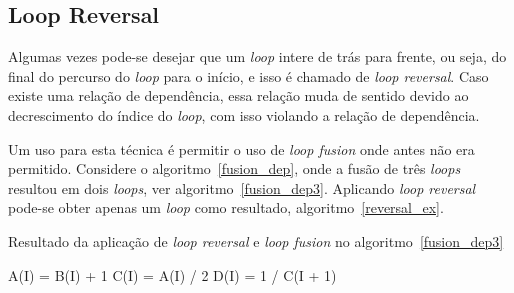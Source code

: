 \subsection{Loop Reversal}

Algumas vezes pode-se desejar que um \textit{loop} intere de trás para frente,
ou seja, do final do percurso do \textit{loop} para o início, e isso é chamado
de \textit{loop reversal}.
Caso existe uma relação de dependência, essa relação muda de sentido devido ao
decrescimento do índice do \textit{loop}, com isso violando a relação de 
dependência.

Um uso para esta técnica é permitir o uso de \textit{loop fusion} onde antes não
era permitido. 
Considere o algoritmo~\ref{fusion_dep}, onde a fusão de três \textit{loops}
resultou em dois \textit{loops}, ver algoritmo~\ref{fusion_dep3}. 
Aplicando \textit{loop reversal} pode-se obter apenas um \textit{loop} como
resultado, algoritmo~\ref{reversal_ex}.

\begin{algorithm}
\caption{Resultado da aplicação de \textit{loop reversal} e \textit{loop fusion}
no algoritmo~\ref{fusion_dep3}}
\label{reversal_ex}
\begin{algorithmic}[1]

\STATE A(I) = B(I) + 1
\STATE C(I) = A(I) / 2
\STATE D(I) = 1 / C(I + 1)
\ENDFOR

\end{algorithmic}
\end{algorithm}
